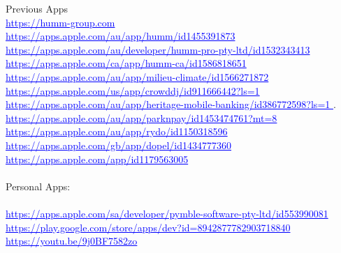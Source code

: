 \documentclass{article}
\begin{document}
% 

Previous Apps \\
\textcolor{blue} { \underline{  https://humm-group.com  } }  \\
\textcolor{blue} { \underline{ https://apps.apple.com/au/app/humm/id1455391873  } }  \\
\textcolor{blue} { \underline{ https://apps.apple.com/au/developer/humm-pro-pty-ltd/id1532343413  } }  \\
\textcolor{blue} { \underline{ https://apps.apple.com/ca/app/humm-ca/id1586818651 } }  \\
\textcolor{blue} { \underline{ https://apps.apple.com/au/app/milieu-climate/id1566271872   } }  \\
\textcolor{blue} { \underline{  https://apps.apple.com/us/app/crowddj/id911666442?ls=1 }} \\
\textcolor{blue} { \underline{  https://apps.apple.com/au/app/heritage-mobile-banking/id386772598?ls=1 }}. \\
\textcolor{blue} { \underline{ https://apps.apple.com/au/app/parknpay/id1453474761?mt=8  } } \\
\textcolor{blue} { \underline{https://apps.apple.com/au/app/rydo/id1150318596 } } \\
\textcolor{blue}{ \underline{https://apps.apple.com/gb/app/dopel/id1434777360}} \\
\textcolor{blue} { \underline{https://apps.apple.com/app/id1179563005 } } \\
\\
Personal Apps:\\
\\
\textcolor{blue}{ \underline{ https://apps.apple.com/sa/developer/pymble-software-pty-ltd/id553990081}}  \\
\textcolor{blue}{ \underline{ https://play.google.com/store/apps/dev?id=8942877782903718840 }}  \\
\textcolor{blue}{ \underline{ https://youtu.be/9j0BF7582zo }}  \\
\\
\end{document}
